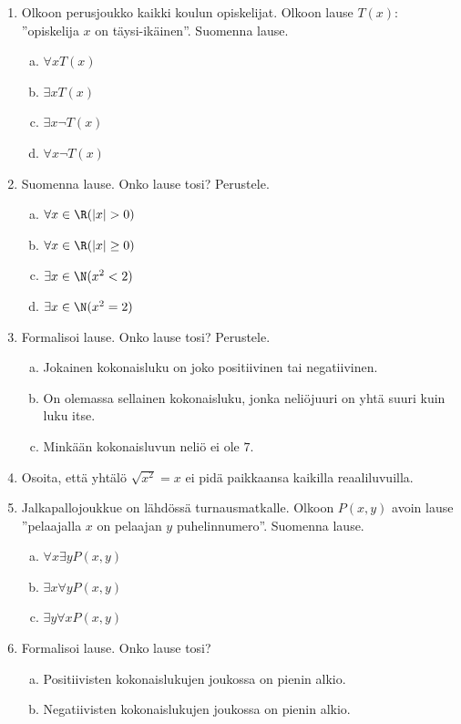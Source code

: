 \begin{enumerate}

\item Olkoon perusjoukko kaikki koulun opiskelijat. Olkoon lause
$T(x)$: ''opiskelija $x$ on täysi-ikäinen''. Suomenna lause.
\begin{enumerate}[a)]
\item $\forall x T(x)$
\item $\exists x T(x)$
\item $\exists x \lnot T(x)$
\item $\forall x \lnot T(x)$
\end{enumerate}

\item Suomenna lause. Onko lause tosi? Perustele.
\begin{enumerate}[a)]
\item $\forall x\in\R (|x| > 0)$
\item $\forall x\in\R (|x| \ge 0)$
\item $\exists x\in\N (x^2 < 2)$
\item $\exists x\in\N (x^2 = 2)$
\end{enumerate}

\item
Formalisoi lause. Onko lause tosi? Perustele.
\begin{enumerate}[a)]
\item Jokainen kokonaisluku on joko positiivinen tai
negatiivinen.
\item On olemassa sellainen kokonaisluku, jonka neliöjuuri on
yhtä suuri kuin luku itse.
\item Minkään kokonaisluvun neliö ei ole $7$.
\end{enumerate}

\item Osoita, että yhtälö $\sqrt{x^2} = x$ ei pidä paikkaansa
kaikilla reaaliluvuilla.

\item Jalkapallojoukkue on lähdössä turnausmatkalle. Olkoon
$P(x, y)$ avoin lause ''pelaajalla $x$ on pelaajan $y$
puhelinnumero''. Suomenna lause.
\begin{enumerate}[a)]
\item $\forall x \exists y P(x, y)$
\item $\exists x \forall y P(x, y)$
\item $\exists y \forall x P(x, y)$
\end{enumerate}

\item
Formalisoi lause. Onko lause tosi?
\begin{enumerate}[a)]
\item Positiivisten kokonaislukujen joukossa on pienin alkio.
\item Negatiivisten kokonaislukujen joukossa on pienin alkio.
\end{enumerate}


\end{enumerate}
